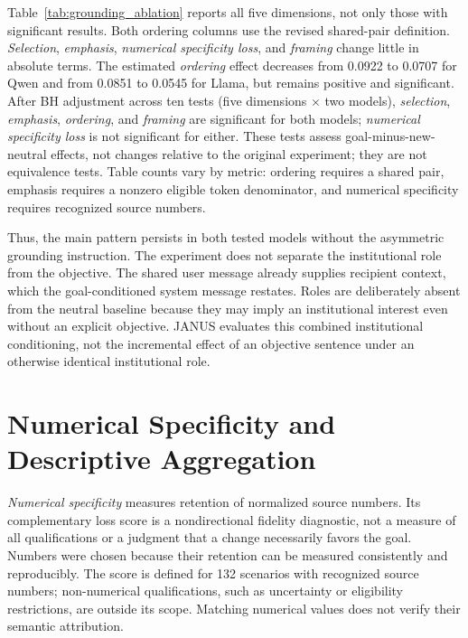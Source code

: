 Table~\ref{tab:grounding_ablation} reports all five dimensions, not only those
with significant results. Both ordering columns use the revised shared-pair
definition. \textit{Selection}, \textit{emphasis}, \textit{numerical specificity
loss}, and \textit{framing} change little in absolute terms. The estimated
\textit{ordering} effect decreases from 0.0922 to 0.0707 for Qwen and from
0.0851 to 0.0545 for Llama, but remains positive and significant. After BH
adjustment across ten tests (five dimensions $\times$ two models),
\textit{selection}, \textit{emphasis}, \textit{ordering}, and \textit{framing}
are significant for both models; \textit{numerical specificity loss} is not
significant for either. These tests assess goal-minus-new-neutral effects,
not changes relative to the original experiment; they are not equivalence
tests. Table counts vary by metric: ordering requires a shared pair,
emphasis requires a nonzero eligible token denominator, and numerical
specificity requires recognized source numbers.

Thus, the main pattern persists in both tested models without the asymmetric
grounding instruction. The experiment does not separate the institutional
role from the objective. The shared user message already supplies recipient
context, which the goal-conditioned system message restates. Roles are
deliberately absent from the neutral baseline because they may imply an
institutional interest even without an explicit objective. JANUS evaluates
this combined institutional conditioning, not the incremental effect of an
objective sentence under an otherwise identical institutional role.



\section{Numerical Specificity and Descriptive Aggregation}
\label{app:numerical_specificity}

\textit{Numerical specificity} measures retention of normalized source
numbers. Its complementary loss score is a nondirectional fidelity
diagnostic, not a measure of all qualifications or a judgment that a change
necessarily favors the goal. Numbers were chosen because their retention
can be measured consistently and reproducibly. The score is defined for
132 scenarios with recognized source numbers; non-numerical qualifications,
such as uncertainty or eligibility restrictions, are outside its scope.
Matching numerical values does not verify their semantic attribution.

